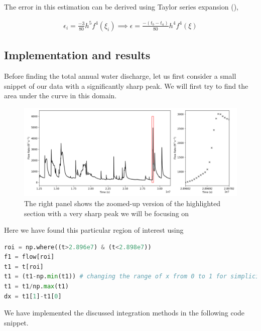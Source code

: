 The error in this estimation can be derived using Taylor series expansion  (\cite{matthews-2004}),

\begin{align}
    \epsilon_i = \frac{-3}{80}h^5f^{4}(\xi_i) \implies \epsilon = \frac{-(t_b-t_a)}{80}h^4f^{4}(\xi)
\end{align}

\subsection{Implementation and results}
Before finding the total annual water discharge, let us first consider a small snippet of our data with a significantly sharp peak. We will first try to find the area under the curve in this domain.

\begin{figure}[H]
    \centering
    \includegraphics[width=1\linewidth]{Figures/2/zoom.png}
    \caption{The right panel shows the zoomed-up version of the highlighted section with a very sharp peak we will be focusing on}
\end{figure}

Here we have found this particular region of interest using 
\begin{lstlisting}[language=Python, caption=Isolating the region of interest]
roi = np.where((t>2.896e7) & (t<2.898e7))
f1 = flow[roi]
t1 = t[roi]
t1 = (t1-np.min(t1)) # changing the range of x from 0 to 1 for simplicity
t1 = t1/np.max(t1)
dx = t1[1]-t1[0]
\end{lstlisting}

We have implemented the discussed integration methods in the following code snippet.


